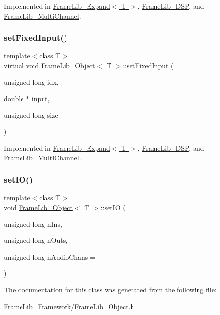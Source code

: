 Implemented in \hyperlink{class_frame_lib___expand_a579f16ec32e05ff84ee766038012fc3f}{Frame\+Lib\+\_\+\+Expand$<$ T $>$}, \hyperlink{class_frame_lib___d_s_p_ad253c096a1c7cc236804dfd1f2e650ec}{Frame\+Lib\+\_\+\+D\+SP}, and \hyperlink{class_frame_lib___multi_channel_af27f3dca507c48459452be825b4c0c72}{Frame\+Lib\+\_\+\+Multi\+Channel}.

\mbox{\label{class_frame_lib___object_a0d3bed42a21ebf248366f4457722beff}} 
\subsubsection{\texorpdfstring{set\+Fixed\+Input()}{setFixedInput()}}
{\footnotesize\ttfamily template$<$class T$>$ \\
virtual void \hyperlink{class_frame_lib___object}{Frame\+Lib\+\_\+\+Object}$<$ T $>$\+::set\+Fixed\+Input (\begin{DoxyParamCaption}\item[{unsigned long}]{idx,  }\item[{double $\ast$}]{input,  }\item[{unsigned long}]{size }\end{DoxyParamCaption})\hspace{0.3cm}{\ttfamily [pure virtual]}}



Implemented in \hyperlink{class_frame_lib___expand_a73f7bf4264d45f56f249d6303b3e4c35}{Frame\+Lib\+\_\+\+Expand$<$ T $>$}, \hyperlink{class_frame_lib___d_s_p_ad15333614446257796e75db254efac78}{Frame\+Lib\+\_\+\+D\+SP}, and \hyperlink{class_frame_lib___multi_channel_a2bbd1050ff53556bf671282312857301}{Frame\+Lib\+\_\+\+Multi\+Channel}.

\mbox{\label{class_frame_lib___object_a5c34227ace795af7da847fff3f2b300d}} 
\subsubsection{\texorpdfstring{set\+I\+O()}{setIO()}}
{\footnotesize\ttfamily template$<$class T$>$ \\
void \hyperlink{class_frame_lib___object}{Frame\+Lib\+\_\+\+Object}$<$ T $>$\+::set\+IO (\begin{DoxyParamCaption}\item[{unsigned long}]{n\+Ins,  }\item[{unsigned long}]{n\+Outs,  }\item[{unsigned long}]{n\+Audio\+Chans = {} }\end{DoxyParamCaption})\hspace{0.3cm}{\ttfamily [inline]}}



The documentation for this class was generated from the following file\+:\begin{DoxyCompactItemize}
\item 
Frame\+Lib\+\_\+\+Framework/\hyperlink{_frame_lib___object_8h}{Frame\+Lib\+\_\+\+Object.\+h}\end{DoxyCompactItemize}
